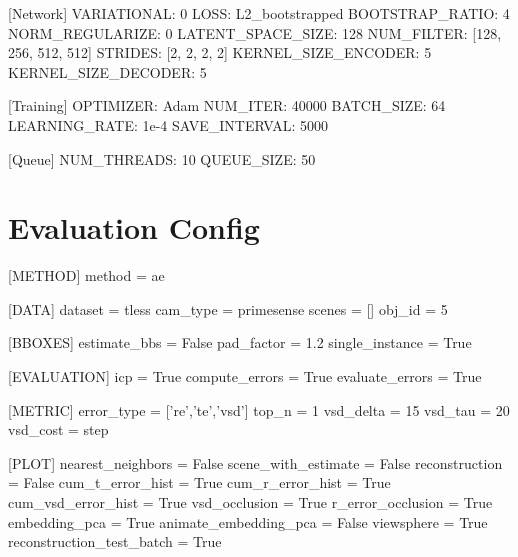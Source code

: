 \documentclass[a4paper,table]{article}
\begin{document}
[Network]
VARIATIONAL: 0
LOSS: L2\_bootstrapped
BOOTSTRAP\_RATIO: 4
NORM\_REGULARIZE: 0
LATENT\_SPACE\_SIZE: 128
NUM\_FILTER: [128, 256, 512, 512]
STRIDES: [2, 2, 2, 2]
KERNEL\_SIZE\_ENCODER: 5
KERNEL\_SIZE\_DECODER: 5


[Training]
OPTIMIZER: Adam
NUM\_ITER: 40000
BATCH\_SIZE: 64
LEARNING\_RATE: 1e-4
SAVE\_INTERVAL: 5000

[Queue]
NUM\_THREADS: 10
QUEUE\_SIZE: 50

\chapter{{\Large Evaluation Config}}

[METHOD]
method = ae

[DATA]
dataset = tless
cam\_type = primesense
scenes = []
obj\_id = 5

[BBOXES]
estimate\_bbs = False
pad\_factor = 1.2
single\_instance = True

[EVALUATION]
icp = True
compute\_errors = True
evaluate\_errors = True

[METRIC]
error\_type = ['re','te','vsd']
top\_n = 1
vsd\_delta = 15
vsd\_tau = 20
vsd\_cost = step

[PLOT]
nearest\_neighbors = False
scene\_with\_estimate = False
reconstruction = False
cum\_t\_error\_hist = True
cum\_r\_error\_hist = True
cum\_vsd\_error\_hist = True
vsd\_occlusion = True
r\_error\_occlusion = True
embedding\_pca = True
animate\_embedding\_pca = False
viewsphere = True
reconstruction\_test\_batch = True



\begin{center}
\end{center}
\begin{center}
\end{center}
\begin{center}
\end{center}
\begin{center}
\end{center}
\begin{center}
\end{center}
\end{document}
